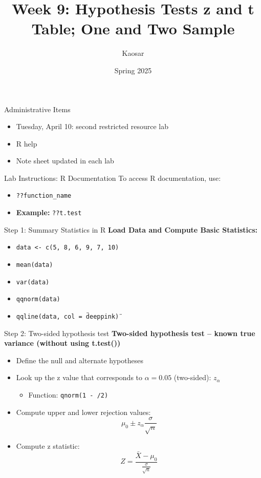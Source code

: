 \documentclass{beamer}
\title{Week 9: Hypothesis Tests z and t Table; One and Two Sample}
\author{Kaosar}
\institute{Auburn University}
\date{Spring 2025}
\begin{document}
\begin{frame}
\titlepage
\end{frame}


\begin{frame}{Administrative Items}
\begin{itemize}
    \item Tuesday, April 10: second restricted resource lab
    \item R help
    \item Note sheet updated in each lab
\end{itemize}
\end{frame}

\begin{frame}{Lab Instructions: R Documentation}
To access R documentation, use:
\begin{itemize}
    \item \texttt{??function\_name}
    \item \textbf{Example:} \texttt{??t.test}
\end{itemize}
\end{frame}

\begin{frame}{Step 1: Summary Statistics in R}
\textbf{Load Data and Compute Basic Statistics:}
\begin{itemize}
    \item \texttt{data <- c(5, 8, 6, 9, 7, 10)}
    \item \texttt{mean(data)}
    \item \texttt{var(data)}
    \item \texttt{qqnorm(data)}
    \item \texttt{qqline(data, col = \"deeppink\")}
\end{itemize}
\end{frame}
\begin{frame}{Step 2: Two-sided hypothesis test}
\textbf{Two-sided hypothesis test – known true variance (without using t.test())}
\begin{itemize}
    \item Define the null and alternate hypotheses
    \item Look up the z value that corresponds to \( \alpha = 0.05 \) (two-sided): \( z_{\alpha} \)
    \begin{itemize}
        \item Function: \texttt{qnorm(1 - {\alpha/2})}
    \end{itemize}
    \item Compute upper and lower rejection values:
    \[
    \mu_0 \pm z_{\alpha} \frac{\sigma}{\sqrt{n}}
    \]
    \item Compute z statistic:
    \[
    Z = \frac{\bar{X} - \mu_0}{\frac{\sigma}{\sqrt{n}}}
    \]
\end{itemize}
\end{frame}
\end{document}
